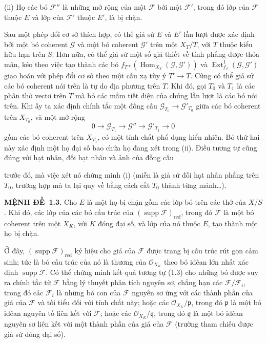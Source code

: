 \documentclass[11pt,twoside,openany]{book}
\numberwithin{equation}{section}
\newcommand{\src}[1]{%
  \phantomsection\hypertarget{src:\fgasourceid:#1}{}%
  \marginpar{\raggedleft\footnotesize\sffamily #1}%
}
\newcommand{\fgasourceid}{unset}
\newcommand{\result}[2]{\par\medskip\noindent\textbf{#1\if\relax\detokenize{#2}\relax\else\ #2\fi.}\quad}
\begin{document}
\smallskip
\noindent (ii) Họ các bó $\mathcal F''$ là những mở rộng của một $\mathcal F$
bởi một $\mathcal F'$, trong đó lớp của $\mathcal F$ thuộc $E$ và lớp của
$\mathcal F'$ thuộc $E'$, là bị chặn.

Sau một phép đổi cơ sở thích hợp, có thể giả sử $E$ và $E'$ lần lượt được xác
định bởi một bó coherent $\mathcal G$ và một bó coherent $\mathcal G'$ trên
một $X_T/T$, với $T$ thuộc kiểu hữu hạn trên $S$. Hơn nữa, có thể giả sử một
số giả thiết về tính phẳng được thỏa mãn, kéo theo việc tạo thành các bó
$f_{T*}(\operatorname{Hom}_{X_T}(\mathcal G,\mathcal G'))$ và
$\operatorname{Ext}^{1}_{f_T}(\mathcal G,\mathcal G')$ giao hoán với phép đổi
cơ sở theo một cấu xạ tùy ý $T'\longrightarrow T$. Cũng có thể giả sử các bó
coherent nói trên là tự do địa phương trên $T$. Khi đó, gọi $T_0$ và $T_1$
là các phân thớ vectơ trên $T$ mà bó các mầm tiết diện của chúng lần lượt là
các bó nói trên. Khi ấy ta xác định chính tắc một đồng cấu
$\mathcal G_{T_0}\longrightarrow\mathcal G'_{T_0}$ giữa các bó coherent trên
$X_{T_0}$, và một mở rộng
\[
0\longrightarrow\mathcal G_{T_1}\longrightarrow\mathcal G''
\longrightarrow\mathcal G'_{T_1}\longrightarrow0
\]
gồm các bó coherent trên $X_{T_1}$, có một tính chất phổ dụng hiển nhiên. Bó
thứ hai này xác định một họ đại số bao chứa họ đang xét trong (ii). Điều tương
tự cũng đúng với hạt nhân, đối hạt nhân và ảnh của đồng cấu
\src{253}
trước đó, mà việc xét nó chứng minh (i) (miễn là giả sử đối hạt nhân phẳng trên
$T_0$, trường hợp mà ta lại quy về bằng cách cắt $T_0$ thành từng
mảnh\ldots).

\result{MỆNH ĐỀ}{1.3} Cho $E$ là một họ bị chặn gồm các lớp bó trên các thớ
của $X/S$. Khi đó, các lớp của các bó cấu trúc của
$(\operatorname{supp}\mathcal F)_{\mathrm{red}}$, trong đó $\mathcal F$ là một
bó coherent trên một $X_K$, với $K$ đóng đại số, và lớp của nó thuộc $E$, tạo
thành một họ bị chặn.

Ở đây, $(\operatorname{supp}\mathcal F)_{\mathrm{red}}$ ký hiệu cho giá của
$\mathcal F$ được trang bị cấu trúc rút gọn cảm sinh; tức là bó cấu trúc của nó
là thương của $\mathcal O_{X_K}$ theo bó iđêan lớn nhất xác định
$\operatorname{supp}\mathcal F$. Có thể chứng minh kết quả tương tự (1.3) cho
những bó được suy ra chính tắc từ $\mathcal F$ bằng lý thuyết phân tích nguyên
sơ, chẳng hạn các $\mathcal F/\mathcal F_i$, trong đó các $\mathcal F_i$ là
những bó con của $\mathcal F$ nguyên sơ ứng với các thành phần của giá của
$\mathcal F$ và tối tiểu đối với tính chất này; hoặc các
$\mathcal O_{X_K}/\mathfrak p$, trong đó $\mathfrak p$ là một bó iđêan nguyên
tố liên kết với $\mathcal F$; hoặc các $\mathcal O_{X_K}/\mathfrak q$, trong đó
$\mathfrak q$ là một bó iđêan nguyên sơ liên kết với một thành phần của giá của
$\mathcal F$ (trường tham chiếu được giả sử đóng đại số).
\end{document}
